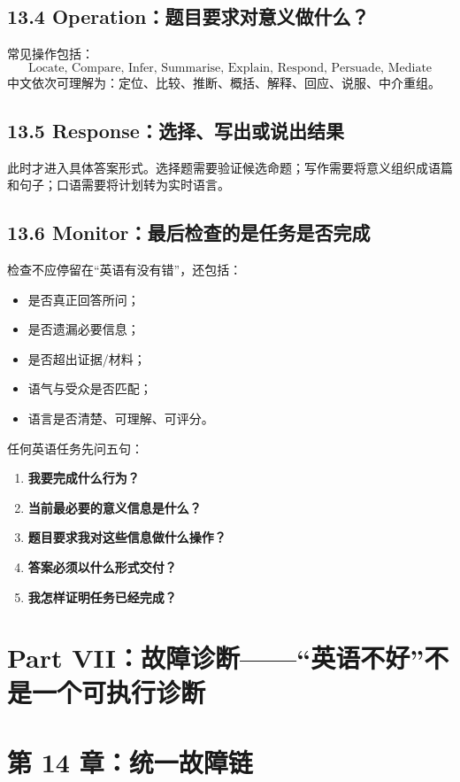 \documentclass[11pt,a4paper]{ctexart}
\newcommand{\kw}[1]{\textbf{#1}}
\begin{document}
\subsection{13.4 Operation：题目要求对意义做什么？}
常见操作包括：
\[
\boxed{
\text{Locate, Compare, Infer, Summarise, Explain, Respond, Persuade, Mediate}
}
\]
中文依次可理解为：定位、比较、推断、概括、解释、回应、说服、中介重组。

\subsection{13.5 Response：选择、写出或说出结果}
此时才进入具体答案形式。选择题需要验证候选命题；写作需要将意义组织成语篇和句子；口语需要将计划转为实时语言。

\subsection{13.6 Monitor：最后检查的是任务是否完成}
检查不应停留在“英语有没有错”，还包括：
\begin{itemize}
  \item 是否真正回答所问；
  \item 是否遗漏必要信息；
  \item 是否超出证据/材料；
  \item 语气与受众是否匹配；
  \item 语言是否清楚、可理解、可评分。
\end{itemize}

\begin{corebox}[考试通用压缩]
任何英语任务先问五句：
\begin{enumerate}
  \item \kw{我要完成什么行为？}
  \item \kw{当前最必要的意义信息是什么？}
  \item \kw{题目要求我对这些信息做什么操作？}
  \item \kw{答案必须以什么形式交付？}
  \item \kw{我怎样证明任务已经完成？}
\end{enumerate}
\end{corebox}

\newpage
\section{Part VII：故障诊断——“英语不好”不是一个可执行诊断}

\section{第 14 章：统一故障链}
\end{document}
